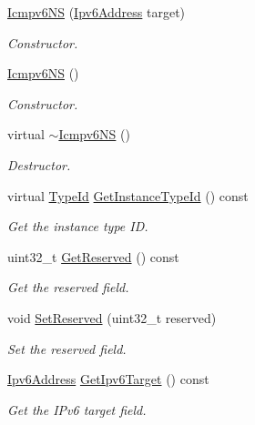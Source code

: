\begin{DoxyCompactItemize}
\item 
\hyperlink{classns3_1_1Icmpv6NS_ace0333c336406dd727c895a2575d575d}{Icmpv6\+NS} (\hyperlink{classns3_1_1Ipv6Address}{Ipv6\+Address} target)
\begin{DoxyCompactList}\small\item\em Constructor. \end{DoxyCompactList}\item 
\hyperlink{classns3_1_1Icmpv6NS_ad8db191a5128ac6f7e9e270086bc1583}{Icmpv6\+NS} ()
\begin{DoxyCompactList}\small\item\em Constructor. \end{DoxyCompactList}\item 
virtual \hyperlink{classns3_1_1Icmpv6NS_a905f86238d484f16869827cf2e4ad25a}{$\sim$\+Icmpv6\+NS} ()
\begin{DoxyCompactList}\small\item\em Destructor. \end{DoxyCompactList}\item 
virtual \hyperlink{classns3_1_1TypeId}{Type\+Id} \hyperlink{classns3_1_1Icmpv6NS_a00a83a16e41158c10bfd4601dfb0de65}{Get\+Instance\+Type\+Id} () const 
\begin{DoxyCompactList}\small\item\em Get the instance type ID. \end{DoxyCompactList}\item 
uint32\+\_\+t \hyperlink{classns3_1_1Icmpv6NS_ac644078b990aefc3a36270d907b468fd}{Get\+Reserved} () const 
\begin{DoxyCompactList}\small\item\em Get the reserved field. \end{DoxyCompactList}\item 
void \hyperlink{classns3_1_1Icmpv6NS_a558a5725b7730bd4ff2d1efde2eb0d34}{Set\+Reserved} (uint32\+\_\+t reserved)
\begin{DoxyCompactList}\small\item\em Set the reserved field. \end{DoxyCompactList}\item 
\hyperlink{classns3_1_1Ipv6Address}{Ipv6\+Address} \hyperlink{classns3_1_1Icmpv6NS_abd251e7e0e64e9b0ff224ef9a14591f1}{Get\+Ipv6\+Target} () const 
\begin{DoxyCompactList}\small\item\em Get the I\+Pv6 target field. \end{DoxyCompactList}\item 

\end{DoxyCompactItemize}
